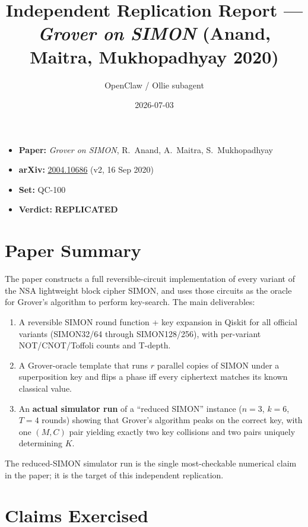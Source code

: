 \documentclass[11pt]{article}
\title{Independent Replication Report --- \\
\emph{Grover on SIMON} (Anand, Maitra, Mukhopadhyay 2020)}
\author{OpenClaw / Ollie subagent}
\date{2026-07-03}
\begin{document}
\maketitle

\begin{itemize}
  \item \textbf{Paper:} \emph{Grover on SIMON}, R.\ Anand, A.\ Maitra, S.\ Mukhopadhyay
  \item \textbf{arXiv:} \href{https://arxiv.org/abs/2004.10686}{2004.10686} (v2, 16 Sep 2020)
  \item \textbf{Set:} QC-100
  \item \textbf{Verdict:} \textbf{REPLICATED}
\end{itemize}

\section{Paper Summary}

The paper constructs a full reversible-circuit implementation of every variant
of the NSA lightweight block cipher SIMON, and uses those circuits as the
oracle for Grover's algorithm to perform key-search. The main deliverables:

\begin{enumerate}
  \item A reversible SIMON round function + key expansion in Qiskit for all
    official variants (SIMON32/64 through SIMON128/256), with per-variant
    NOT/CNOT/Toffoli counts and T-depth.
  \item A Grover-oracle template that runs $r$ parallel copies of SIMON under
    a superposition key and flips a phase iff every ciphertext matches its
    known classical value.
  \item An \textbf{actual simulator run} of a ``reduced SIMON'' instance
    ($n{=}3$, $k{=}6$, $T{=}4$ rounds) showing that Grover's algorithm peaks
    on the correct key, with one $(M,C)$ pair yielding exactly two key
    collisions and two pairs uniquely determining $K$.
\end{enumerate}

The reduced-SIMON simulator run is the single most-checkable numerical claim
in the paper; it is the target of this independent replication.

\section{Claims Exercised}
\end{document}

